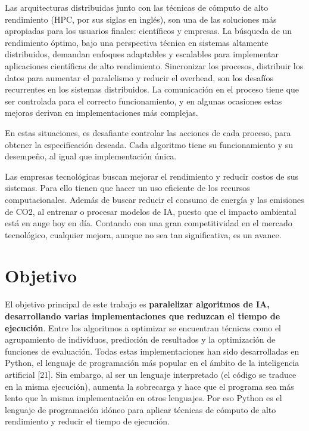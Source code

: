 Las arquitecturas distribuidas junto con las técnicas de cómputo de alto rendimiento (HPC, por sus siglas en inglés), son una de las soluciones más apropiadas para los usuarios finales: científicos y empresas. La búsqueda de un rendimiento óptimo, bajo una perspectiva técnica en sistemas altamente distribuidos, demandan enfoques adaptables y escalables para implementar aplicaciones científicas de alto rendimiento. Sincronizar los procesos, distribuir los datos para aumentar el paralelismo y reducir el overhead, son los desafíos recurrentes en los sistemas distribuidos. La comunicación en el proceso tiene que ser controlada para el correcto funcionamiento, y en algunas ocasiones estas mejoras derivan en implementaciones más complejas.

En estas situaciones, es desafiante controlar las acciones de cada proceso, para obtener la especificación deseada. Cada algoritmo tiene su funcionamiento y su desempeño, al igual que implementación única.

Las empresas tecnológicas buscan mejorar el rendimiento y reducir costos de sus sistemas. Para ello tienen que hacer un uso eficiente de los recursos computacionales. Además de buscar reducir el consumo de energía y las emisiones de CO2, al entrenar o procesar modelos de IA, puesto que el impacto ambiental está en auge hoy en día.  Contando con una gran competitividad en el mercado tecnológico, cualquier mejora, aunque no sea tan significativa, es un avance.




\newpage


\section{Objetivo}

El objetivo principal de este trabajo es \textbf{paralelizar algoritmos de IA, desarrollando varias implementaciones que reduzcan el tiempo de ejecución}. Entre los algoritmos a optimizar se encuentran técnicas como el agrupamiento de individuos, predicción de resultados y la optimización de funciones de evaluación. Todas estas implementaciones han sido desarrolladas en Python, el lenguaje de programación más popular en el ámbito de la inteligencia artificial [21]. Sin embargo, al ser un lenguaje interpretado (el código se traduce en la misma ejecución), aumenta la sobrecarga y hace que el programa sea más lento que la misma implementación en otros lenguajes. Por eso Python es el lenguaje de programación idóneo para aplicar técnicas de cómputo de alto rendimiento y reducir el tiempo de ejecución.


